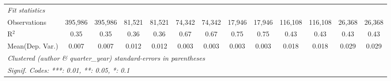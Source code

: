 \begin{tabular}{lcccccccccccc}
   \midrule
   \emph{Fit statistics}\\
   Observations                             & 395,986       & 395,986      & 81,521         & 81,521         & 74,342   & 74,342         & 17,946  & 17,946        & 116,108      & 116,108  & 26,368        & 26,368\\  
   R$^2$                                    & 0.35          & 0.35         & 0.36           & 0.36           & 0.67     & 0.67           & 0.75    & 0.75          & 0.43         & 0.43     & 0.43          & 0.43\\  
Mean(Dep. Var.) & 0.007 & 0.007 & 0.012 & 0.012 & 0.003 & 0.003 & 0.003 & 0.003 & 0.018 & 0.018 & 0.029 & 0.029 \\
   \midrule \midrule
   \multicolumn{13}{l}{\emph{Clustered (author \& quarter\_year) standard-errors in parentheses}}\\
   \multicolumn{13}{l}{\emph{Signif. Codes: ***: 0.01, **: 0.05, *: 0.1}}\\
\end{tabular}
\par\endgroup
